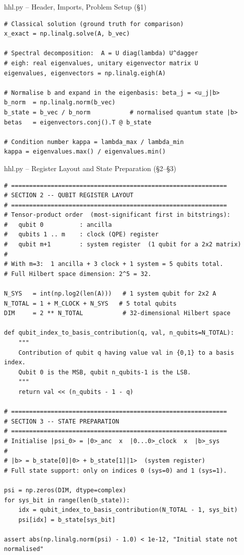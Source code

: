 \documentclass{beamer}
\begin{document}
\begin{frame}{hhl.py -- Header, Imports, Problem Setup (\S1)}
\begin{lstlisting}
# Classical solution (ground truth for comparison)
x_exact = np.linalg.solve(A, b_vec)

# Spectral decomposition:  A = U diag(lambda) U^dagger
# eigh: real eigenvalues, unitary eigenvector matrix U
eigenvalues, eigenvectors = np.linalg.eigh(A)

# Normalise b and expand in the eigenbasis: beta_j = <u_j|b>
b_norm  = np.linalg.norm(b_vec)
b_state = b_vec / b_norm           # normalised quantum state |b>
betas   = eigenvectors.conj().T @ b_state

# Condition number kappa = lambda_max / lambda_min
kappa = eigenvalues.max() / eigenvalues.min()
\end{lstlisting}
\end{frame}


\begin{frame}{hhl.py -- Register Layout and State Preparation (\S2--\S3)}
\begin{lstlisting}
# ============================================================
# SECTION 2 -- QUBIT REGISTER LAYOUT
# ============================================================
# Tensor-product order  (most-significant first in bitstrings):
#   qubit 0          : ancilla
#   qubits 1 .. m    : clock (QPE) register
#   qubit m+1        : system register  (1 qubit for a 2x2 matrix)
#
# With m=3:  1 ancilla + 3 clock + 1 system = 5 qubits total.
# Full Hilbert space dimension: 2^5 = 32.

N_SYS   = int(np.log2(len(A)))   # 1 system qubit for 2x2 A
N_TOTAL = 1 + M_CLOCK + N_SYS   # 5 total qubits
DIM     = 2 ** N_TOTAL           # 32-dimensional Hilbert space

def qubit_index_to_basis_contribution(q, val, n_qubits=N_TOTAL):
    """
    Contribution of qubit q having value val in {0,1} to a basis index.
    Qubit 0 is the MSB, qubit n_qubits-1 is the LSB.
    """
    return val << (n_qubits - 1 - q)

# ============================================================
# SECTION 3 -- STATE PREPARATION
# ============================================================
# Initialise |psi_0> = |0>_anc  x  |0...0>_clock  x  |b>_sys
#
# |b> = b_state[0]|0> + b_state[1]|1>  (system register)
# Full state support: only on indices 0 (sys=0) and 1 (sys=1).

psi = np.zeros(DIM, dtype=complex)
for sys_bit in range(len(b_state)):
    idx = qubit_index_to_basis_contribution(N_TOTAL - 1, sys_bit)
    psi[idx] = b_state[sys_bit]

assert abs(np.linalg.norm(psi) - 1.0) < 1e-12, "Initial state not normalised"
\end{lstlisting}
\end{frame}
\end{document}
